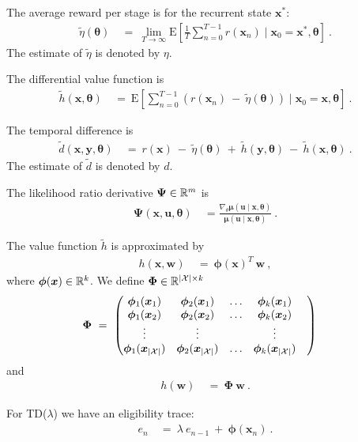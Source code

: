 \documentclass{article}
\newcommand\Bu{\bm{u}}
\newcommand\Bw{\bm{w}}
\newcommand\Bx{\bm{x}}
\newcommand\By{\bm{y}}
\newcommand\Bmu{\bm{\mu}}
\newcommand\Bth{\bm{\theta}}
\newcommand\Bph{\bm{\phi}}
\newcommand\BPh{\bm{\Phi}}
\newcommand\BPs{\bm{\Psi}}
\newcommand{\rE}{\mathrm{E}} \newcommand{\rF}{\mathrm{F}}
\begin{document}
The average reward per stage is for the recurrent state $\Bx^{*}$:
\begin{align}
\tilde{\eta}(\Bth) \ &= \ \lim_{T \to \infty} \rE \left[
\frac{1}{T} \sum_{n=0}^{T-1} r(\Bx_n) \mid \Bx_0=\Bx^{*},\Bth
\right] \ .
\end{align}
The estimate of $\tilde{\eta}$ is denoted by $\eta$.

The differential value function is
\begin{align}
\tilde{h}(\Bx,\Bth) \ &= \ \rE \left[
 \sum_{n=0}^{T-1} ( r(\Bx_n) \ - \ \tilde{\eta}(\Bth) )
\mid \Bx_0=\Bx,\Bth
\right] \ .
\end{align}

The temporal difference is
\begin{align}
\tilde{d}(\Bx,\By,\Bth) \ &= \ r(\Bx) \ - \ \tilde{\eta}(\Bth)
\ + \ \tilde{h}(\By,\Bth) \ - \ \tilde{h}(\Bx,\Bth) \ .
\end{align}
The estimate of $\tilde{d}$ is denoted by $d$.


The likelihood ratio derivative $\BPs \in \dR^m$ is
\begin{align}
\BPs(\Bx,\Bu,\Bth) \ &= \frac{\nabla_{\theta} \Bmu(\Bu \mid \Bx, \Bth)}{\Bmu(\Bu \mid \Bx, \Bth)} \ .
\end{align}

The value function $\tilde{h}$ is approximated by
\begin{align}
h(\Bx,\Bw) \ &= \ \Bph(\Bx)^T \ \Bw \ ,
\end{align}
where $\Bph(\Bx) \in \dR^k$.
We define $\BPh \in \dR^{|\cX| \times k}$
\begin{align}
\BPh \ &= \
\begin{pmatrix}
\Bph_1(\Bx_1) & \Bph_2(\Bx_1) & \ldots & \Bph_k(\Bx_1) \\
\Bph_1(\Bx_2) & \Bph_2(\Bx_2) & \ldots & \Bph_k(\Bx_2) \\
\vdots & \vdots & & \vdots & \\
\Bph_1(\Bx_{|\cX|}) & \Bph_2(\Bx_{|\cX|}) & \ldots & \Bph_k(\Bx_{|\cX|})
\end{pmatrix}
\end{align}
and
\begin{align}
h(\Bw) \ &= \ \BPh \ \Bw \ .
\end{align}

For TD($\lambda$) we have an eligibility trace:
\begin{align}
e_n \ &= \ \lambda \ e_{n-1} \ + \  \Bph(\Bx_n) \ .
\end{align}
\end{document}
